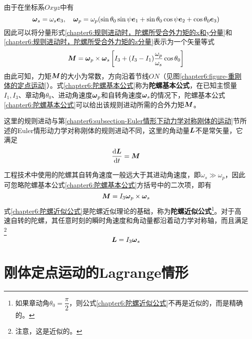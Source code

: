 由于在坐标系$Oxyz$中有
\begin{equation}
	\boldsymbol{\omega}_s = \omega_s\boldsymbol{e}_3,\quad \boldsymbol{\omega}_p = \omega_p(\sin\theta_0\sin\psi\boldsymbol{e}_1+\sin\theta_0\cos\psi\boldsymbol{e}_2+\cos\theta_0\boldsymbol{e}_3)
\end{equation}
因此可以将分量形式\eqref{chapter6:规则进动时，陀螺所受合外力矩的x和y分量}和\eqref{chapter6:规则进动时，陀螺所受合外力矩的z分量}表示为一个矢量等式
\begin{equation}
	\boldsymbol{M} = \boldsymbol{\omega}_p\times\boldsymbol{\omega}_s\left[I_3+(I_3-I_1)\dfrac{\omega_p}{\omega_s}\cos\theta_0\right]
	\label{chapter6:陀螺基本公式}
\end{equation}
由此可知，力矩$\boldsymbol{M}$的大小为常数，方向沿着节线$ON$（见图\ref{chapter6:figure-重刚体的定点运动}）。式\eqref{chapter6:陀螺基本公式}称为{\bf 陀螺基本公式}，在已知主惯量$I_1,I_3$、章动角$\theta_0$、进动角速度$\boldsymbol{\omega}_p$和自转角速度$\boldsymbol{\omega}_s$的情况下，陀螺基本公式\eqref{chapter6:陀螺基本公式}可以给出该规则进动所需的合外力矩$\boldsymbol{M}$。

这里的规则进动与第\ref{chapter6:subsection-Euler情形下动力学对称刚体的运动}节所述的Euler情形动力学对称刚体的规则进动不同，这里的角动量$\boldsymbol{L}$不是常矢量，它满足
\begin{equation*}
	\frac{\mathrm{d} \boldsymbol{L}}{\mathrm{d} t} = \boldsymbol{M}
\end{equation*}


工程技术中使用的陀螺其自转角速度一般远大于其进动角速度，即$\omega_s\gg\omega_p$，因此可忽略陀螺基本公式\eqref{chapter6:陀螺基本公式}方括号中的二次项，即有
\begin{equation}
	\boldsymbol{M} = I_3\boldsymbol{\omega}_p\times \boldsymbol{\omega}_s
	\label{chapter6:陀螺近似公式}
\end{equation}
式\eqref{chapter6:陀螺近似公式}是陀螺近似理论的基础，称为{\bf 陀螺近似公式}\footnote{如果章动角$\theta_0=\dfrac\pi2$，则公式\eqref{chapter6:陀螺近似公式}不再是近似的，而是精确的。}。对于高速自转的陀螺，其任意时刻的瞬时角速度和角动量都沿着动力学对称轴，而且满足\footnote{注意，这是近似的。}
\begin{equation*}
	\boldsymbol{L}=I_3\boldsymbol{\omega}_s
\end{equation*}

\section{刚体定点运动的Lagrange情形}\label{chapter6:section-刚体定点运动的Lagrange情形}

